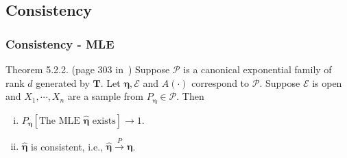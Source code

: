\documentclass[serif,mathserif,professionalfont]{beamer}
\begin{document}
%	
%
%
%
%	
%	
%	



\subsection{Consistency}



\begin{frame}
	
	\frametitle{Consistency - MLE}
	
	\begin{block}{Theorem 5.2.2. (page 303 in~\cite{BD2015})}
		Suppose $ \mathcal{P} $ is a canonical exponential family of rank $ d $ generated by $ \mathbf{T} $. Let $ \boldsymbol{\eta}, \mathcal{E} $ and $ A\left(\cdot \right) $ correspond to $ \mathcal{P} $. Suppose $ \mathcal{E} $ is open and $ X_1, \cdots, X_n  $ are a sample from $ P_{\boldsymbol{\eta}} \in \mathcal{P}  $. Then
		\begin{enumerate}[(i)]
			\item $ P_{\boldsymbol{\eta}}\left[\text{The MLE } \widehat{\boldsymbol{\eta}} \text{ exists} \right] \to 1 $.
			\item $ \widehat{\boldsymbol{\eta}} $ is consistent, i.e., $ \widehat{\boldsymbol{\eta}} \xrightarrow{P} \boldsymbol{\eta} $.
		\end{enumerate}   
	\end{block}
	
\end{frame}
\end{document}
